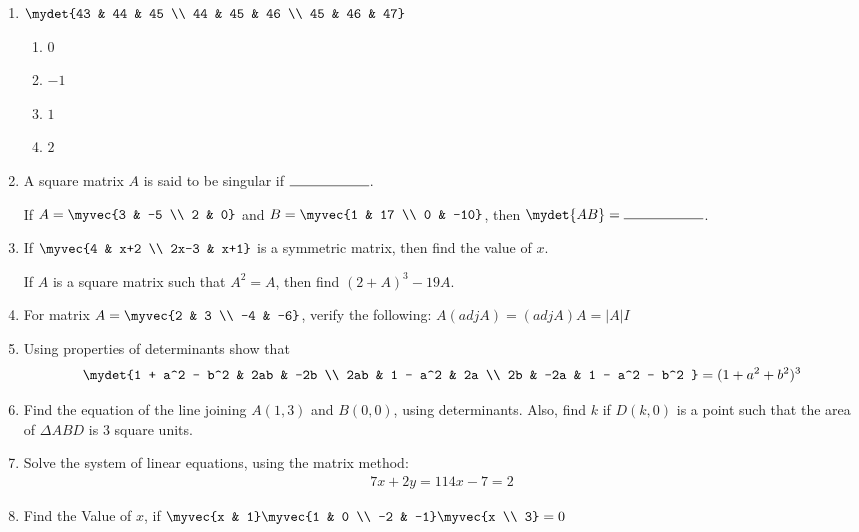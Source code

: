 \documentclass{article}
\begin{document}
\begin{enumerate}
   \item
    $\mydet{43 & 44 & 45 \\ 44 & 45 & 46 \\ 45 & 46 & 47}$
    \begin{enumerate}
        \item $0$
        \item $-1$
        \item $1$
        \item $2$
    \end{enumerate}

    \item A square matrix $A$ is said to be singular if $\rule{2cm}{0.15mm}$.

    If $A =\myvec{3 & -5 \\ 2 & 0}$ and 
    $B = \myvec{1 & 17 \\ 0 & -10}$, then $\mydet{AB} = \rule{2cm}{0.15mm}$.

    \item If $\myvec{4 & x+2 \\ 2x-3 & x+1}$ is a symmetric matrix, then find the value of $x$.

    If $A$ is a square matrix such that $A^2 = A$, then find $(2+A)^3 - 19A$.

    \item For matrix $A = \myvec{2 & 3 \\ -4 & -6}$, verify the following:
    $A(adj A) = (adj A)A = |A|I$

    \item Using properties of determinants show that
    \begin{align*}
        \mydet{1 + a^2 - b^2 & 2ab & -2b \\ 2ab & 1 - a^2 & 2a \\ 2b & -2a & 1 - a^2 - b^2 } = (1 + a^2 + b^2)^3
    \end{align*}

    \item Find the equation of the line joining $A(1, 3)$ and $B(0, 0)$, using determinants. Also, find $k$ if $D(k, 0)$ is a point such that the area of $\Delta{ABD}$ is $3$ square units.
    
    \item Solve the system of linear equations, using the matrix method:
    \begin{align*}
        7x + 2y = 11
        4x - 7 = 2
    \end{align*}
    
    \item Find the Value of $x$, if
    $\myvec{x & 1}
    \myvec{1 & 0 \\ -2 & -1}
    \myvec{x \\ 3} = 0$
    

\end{enumerate}
\end{document}
